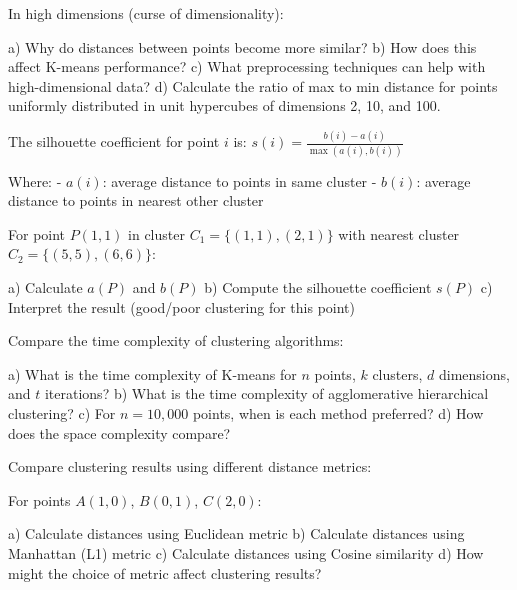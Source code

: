 \documentclass{article}
\newcounter{exercise}
\begin{document}
\begin{tcolorbox}[colback=gray!5!white,colframe=gray!75!black,title=Problem \stepcounter{exercise}: High-Dimensional Clustering]

In high dimensions (curse of dimensionality):

a) Why do distances between points become more similar?
b) How does this affect K-means performance?
c) What preprocessing techniques can help with high-dimensional data?
d) Calculate the ratio of max to min distance for points uniformly distributed in unit hypercubes of dimensions 2, 10, and 100.
\end{tcolorbox}

\begin{tcolorbox}[colback=gray!5!white,colframe=gray!75!black,title=Problem \stepcounter{exercise}: Silhouette Analysis]

The silhouette coefficient for point $i$ is: $s(i) = \frac{b(i) - a(i)}{\max(a(i), b(i))}$

Where:
- $a(i)$: average distance to points in same cluster
- $b(i)$: average distance to points in nearest other cluster

For point $P(1,1)$ in cluster $C_1 = \{(1,1), (2,1)\}$ with nearest cluster $C_2 = \{(5,5), (6,6)\}$:

a) Calculate $a(P)$ and $b(P)$
b) Compute the silhouette coefficient $s(P)$
c) Interpret the result (good/poor clustering for this point)
\end{tcolorbox}

\begin{tcolorbox}[colback=gray!5!white,colframe=gray!75!black,title=Problem \stepcounter{exercise}: Computational Complexity]

Compare the time complexity of clustering algorithms:

a) What is the time complexity of K-means for $n$ points, $k$ clusters, $d$ dimensions, and $t$ iterations?
b) What is the time complexity of agglomerative hierarchical clustering?
c) For $n = 10,000$ points, when is each method preferred?
d) How does the space complexity compare?
\end{tcolorbox}

\begin{tcolorbox}[colback=gray!5!white,colframe=gray!75!black,title=Problem \stepcounter{exercise}: Distance Metrics Impact]

Compare clustering results using different distance metrics:

For points $A(1,0)$, $B(0,1)$, $C(2,0)$:

a) Calculate distances using Euclidean metric
b) Calculate distances using Manhattan (L1) metric  
c) Calculate distances using Cosine similarity
d) How might the choice of metric affect clustering results?
\end{tcolorbox}
\end{document}
